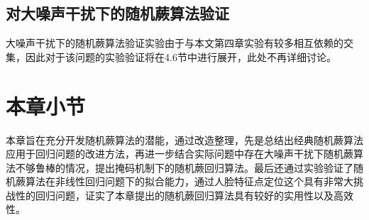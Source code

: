 \subsection{对大噪声干扰下的随机蕨算法验证} %

大噪声干扰下的随机蕨算法验证实验由于与本文第四章实验有较多相互依赖的交集，因此对于该问题的实验验证将在4.6节中进行展开，此处不再详细讨论。


\section{本章小节}
本章旨在充分开发随机蕨算法的潜能，通过改造整理，先是总结出经典随机蕨算法应用于回归问题的改进方法，再进一步结合实际问题中存在大噪声干扰下随机蕨算法不够鲁棒的情况，提出掩码机制下的随机蕨回归算法。最后还通过实验验证了随机蕨算法在非线性回归问题下的拟合能力，通过人脸特征点定位这个具有非常大挑战性的回归问题，证实了本章提出的随机蕨回归算法具有较好的实用性以及高效性。
























